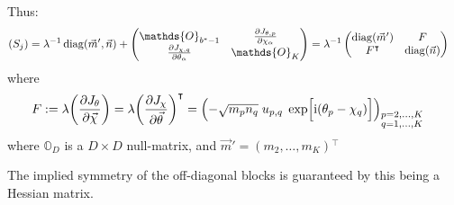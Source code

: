 \documentclass[
	english,
	a4paper,
	fontsize=10pt,
	parskip=half,
	titlepage=true,
	DIV=12,
	final
]{scrreprt}
\newcommand*{\transp}{\ensuremath{^\intercal}}
\newcommand*{\iunit}{\ensuremath{\mathrm{i}}}
\DeclareMathOperator{\diag}{diag}
\begin{document}
Thus:
\begin{align}
	(S_j)
&=
	\lambda^{-1}
	\diag(\vec{m}', \vec{n})
	+
	\begin{pmatrix}
		\mathds{O}_{b^*-1} & 
		\pdv{J_{\theta, p}}{\chi_{\alpha}}
		\\
		\pdv{J_{\chi, q}}{\theta_{\alpha}} &
		\mathds{O}_{K}
	\end{pmatrix}
=
	\lambda^{-1}
	\begin{pmatrix}
		\diag(\vec{m}') & F 			\\
		F\transp & \diag(\vec{n})
	\end{pmatrix}
\end{align}
where
\begin{align}
	F
&:=
	\lambda \qty( \pdv{J_{\theta}}{\vec{\chi}} ) 
	= \lambda \qty( \pdv{J_{\chi}}{\vec{\theta}} )\transp
	= \qty( -\sqrt{m_p n_q} \; u_{p,q} \; \exp[\Big. \iunit(\theta_p - \chi_q)] )_{
		\substack{p = 2, \ldots, K \\ q = 1, \ldots, K}
	}	
\label{eqn:defDetOffDiagonalF}
\end{align}
where $\mathds{O}_{D}$ is a $D \times D$ null-matrix, and $\vec{m}' = (m_2, \ldots, m_K)\transp$

The implied symmetry of the off-diagonal blocks is guaranteed by this being a Hessian matrix.
\end{document}
